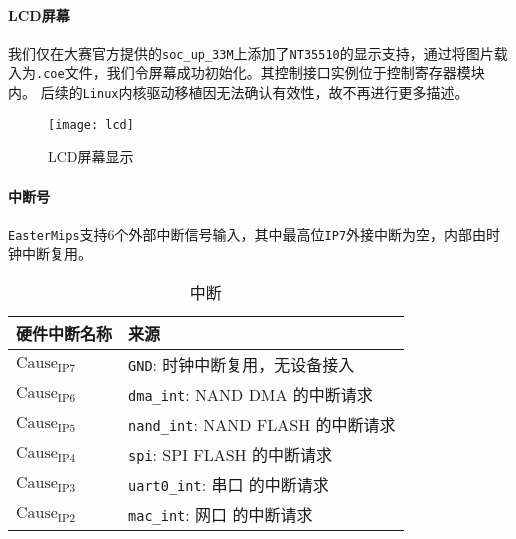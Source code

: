 \hypertarget{lcdux5c4fux5e55}{%
\paragraph{LCD屏幕}\label{lcdux5c4fux5e55}}

我们仅在大赛官方提供的\texttt{soc\_up\_33M}上添加了\texttt{NT35510}的显示支持，通过将图片载入为\texttt{.coe}文件，我们令屏幕成功初始化。其控制接口实例位于控制寄存器模块内。
后续的\texttt{Linux}内核驱动移植因无法确认有效性，故不再进行更多描述。

\begin{figure}[htbp]
	\centering
	\texttt{[image: lcd]}
	\caption{LCD屏幕显示}
	\label{fig:lcd}
\end{figure}

\hypertarget{lcdux5c4fux5e55}{%
\paragraph{中断号}\label{lcdux5c4fux5e55}}
\texttt{EasterMips}支持6个外部中断信号输入，其中最高位\texttt{IP7}外接中断为空，内部由时钟中断复用。
\begin{table}[ht]
    \centering
    \begin{tabular}{l|l}
    \toprule
    硬件中断名称 & 来源 \\
    \midrule
    \(\text{Cause}_\text{IP7}\) & \texttt{GND}: 时钟中断复用，无设备接入 \\
    \(\text{Cause}_\text{IP6}\) & \texttt{dma\_int}: NAND DMA 的中断请求 \\
    \(\text{Cause}_\text{IP5}\) & \texttt{nand\_int}: NAND FLASH 的中断请求 \\
    \(\text{Cause}_\text{IP4}\) & \texttt{spi}: SPI FLASH 的中断请求 \\
    \(\text{Cause}_\text{IP3}\) & \texttt{uart0\_int}: 串口 的中断请求 \\
    \(\text{Cause}_\text{IP2}\) & \texttt{mac\_int}: 网口 的中断请求 \\
    \bottomrule
    \end{tabular}
    \caption{中断}
    \label{tab:interrupt}
\end{table}

